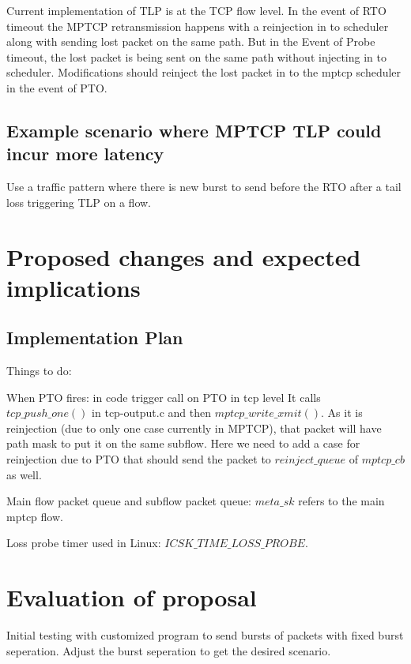 \documentclass[10pt,draftcls,twocolumn]{IEEEconf}
\begin{document}
Current implementation of TLP is at the TCP flow level. In the event of RTO timeout the MPTCP retransmission happens with a reinjection in to scheduler along with sending lost packet on the same path. But in the Event of Probe timeout, the lost packet is being sent on the same path without injecting in to scheduler.  Modifications should reinject the lost packet in to the mptcp scheduler in the event of PTO.

\subsection{Example scenario where MPTCP TLP could incur more latency}

Use a traffic pattern where there is new burst to send before the RTO after a tail loss triggering TLP on a flow.


\section{Proposed changes and expected implications}


\subsection{Implementation Plan}

Things to do:



When PTO fires: in code trigger call on PTO in tcp level
It calls ${tcp\_push\_one()}$ in tcp-output.c and then ${mptcp\_write\_xmit()}$.
As it is reinjection (due to only one case currently in MPTCP), that packet will have path mask
to put it on the same subflow. Here we need to add a case for reinjection due to PTO that should
send the packet to $reinject\_queue$ of ${mptcp\_cb}$ as well.


Main flow packet queue and subflow packet queue: ${meta\_sk}$ refers to the
main mptcp flow.

Loss probe timer used in Linux: ${ICSK\_TIME\_LOSS\_PROBE}$.

\section{Evaluation of proposal}

Initial testing with customized program to send bursts of packets with fixed burst seperation. Adjust the burst seperation to get the desired scenario.







\end{document}
